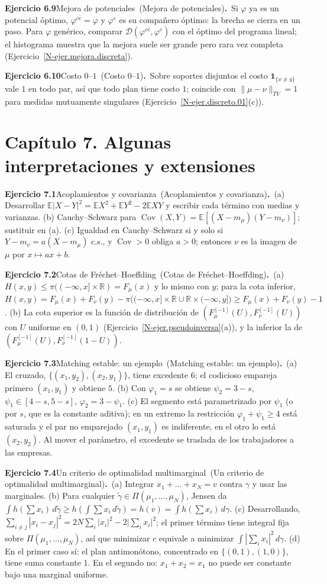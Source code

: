 \documentclass[11pt,a4paper]{amsart}
\newcommand{\R}{{\mathbb R}}
\newcommand{\E}{{\mathbb E}}
\newcommand{\D}{{\mathcal D}}
\newcommand{\I}{{\mathbf 1}}
\theoremstyle{remark}
\theoremstyle{definition}
\numberwithin{subsection}{section}
\numberwithin{equation}{section}
\newcommand{\ejlabel}[2]{\par\medskip\noindent\textbf{Ejercicio #1}\ifx\relax#2\relax\else\ (#2)\fi\textbf{.}\ }
\begin{document}
\ejlabel{6.9}{Mejora de potenciales}Si $\varphi$ ya es un potencial óptimo, $\varphi^{c\bar c}=\varphi$ y $\varphi^c$ es su compañero óptimo: la brecha se cierra en un paso. Para $\varphi$ genérico, comparar $\D(\varphi^{c\bar c},\varphi^c)$ con el óptimo del programa lineal; el histograma muestra que la mejora suele ser grande pero rara vez completa (Ejercicio~\ref{N-ejer.mejora.discreta}).

\ejlabel{6.10}{Costo $0$--$1$}Sobre soportes disjuntos el costo $\I_{\{x\ne y\}}$ vale $1$ en todo par, así que todo plan tiene costo $1$; coincide con $\|\mu-\nu\|_{TV}=1$ para medidas mutuamente singulares (Ejercicio~\ref{N-ejer.discreto.01}(c)).

\section*{Capítulo 7. Algunas interpretaciones y extensiones}
\ejlabel{7.1}{Acoplamientos y covarianza}(a) Desarrollar $\E|X-Y|^2=\E X^2+\E Y^2-2\E XY$ y escribir cada término con medias y varianzas. (b) Cauchy--Schwarz para $\operatorname{Cov}(X,Y)=\E[(X-m_\mu)(Y-m_\nu)]$; sustituir en (a). (c) Igualdad en Cauchy--Schwarz si y solo si $Y-m_\nu=a(X-m_\mu)$ c.s., y $\operatorname{Cov}>0$ obliga $a>0$; entonces $\nu$ es la imagen de $\mu$ por $x\mapsto ax+b$.

\ejlabel{7.2}{Cotas de Fréchet--Hoeffding}(a) $H(x,y)\le\pi((-\infty,x]\times\R)=F_\mu(x)$ y lo mismo con $y$; para la cota inferior, $H(x,y)=F_\mu(x)+F_\nu(y)-\pi\bigl((-\infty,x]\times\R\cup\R\times(-\infty,y]\bigr)\ge F_\mu(x)+F_\nu(y)-1$. (b) La cota superior es la función de distribución de $(F_\mu^{[-1]}(U),F_\nu^{[-1]}(U))$ con $U$ uniforme en $(0,1)$ (Ejercicio~\ref{N-ejer.pseudoinversa}(a)), y la inferior la de $(F_\mu^{[-1]}(U),F_\nu^{[-1]}(1-U))$.

\ejlabel{7.3}{Matching estable: un ejemplo}(a) El cruzado, $\{(x_1,y_2),(x_2,y_1)\}$, tiene excedente $6$; el codicioso empareja primero $(x_1,y_1)$ y obtiene $5$. (b) Con $\varphi_1=s$ se obtiene $\psi_2=3-s$, $\psi_1\in[4-s,5-s]$, $\varphi_2=3-\psi_1$. (c) El segmento está parametrizado por $\psi_1$ (o por $s$, que es la constante aditiva); en un extremo la restricción $\varphi_1+\psi_1\ge4$ está saturada y el par no emparejado $(x_1,y_1)$ es indiferente, en el otro lo está $(x_2,y_2)$. Al mover el parámetro, el excedente se traslada de los trabajadores a las empresas.

\ejlabel{7.4}{Un criterio de optimalidad multimarginal}(a) Integrar $x_1+\dots+x_N=v$ contra $\gamma$ y usar las marginales. (b) Para cualquier $\tilde\gamma\in\Pi(\mu_1,\dots,\mu_N)$, Jensen da $\int h(\sum x_i)\,d\tilde\gamma\ge h(\int\sum x_i\,d\tilde\gamma)=h(v)=\int h(\sum x_i)\,d\gamma$. (c) Desarrollando, $\sum_{i\ne j}|x_i-x_j|^2=2N\sum_i|x_i|^2-2\bigl|\sum_ix_i\bigr|^2$; el primer término tiene integral fija sobre $\Pi(\mu_1,\dots,\mu_N)$, así que minimizar $c$ equivale a minimizar $\int|\sum_ix_i|^2\,d\gamma$. (d) En el primer caso sí: el plan antimonótono, concentrado en $\{(0,1),(1,0)\}$, tiene suma constante $1$. En el segundo no: $x_1+x_2=x_1$ no puede ser constante bajo una marginal uniforme.
\end{document}
